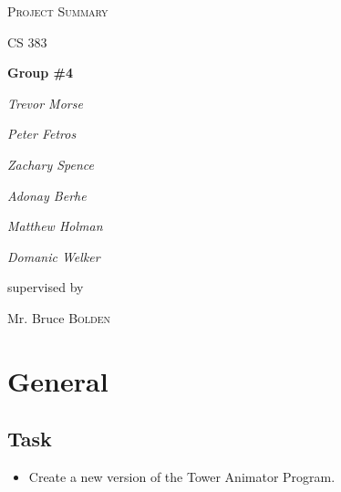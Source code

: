 \documentclass[12pt]{article}
\begin{document}
	\begin{titlepage}
		\centering
		{\scshape\LARGE Project Summary \par}
		\vspace{1cm}
		{\scshape\Large CS 383\par}
		\vspace{1.5cm}
		{\huge\bfseries Group \#4\par}
		\vspace{2cm}
		{\Large\itshape Trevor Morse\par}
		{\Large\itshape Peter Fetros\par}
		{\Large\itshape Zachary Spence\par}
		{\Large\itshape Adonay Berhe\par}
		{\Large\itshape Matthew Holman\par}
		{\Large\itshape Domanic Welker\par}
		\vfill
		supervised by\par
		Mr. Bruce \textsc{Bolden}
		
		\vfill
	\end{titlepage}
	
	\tableofcontents
	\clearpage
	
	\section{General}
	\subsection{Task}
	\begin{itemize}
		\item Create a new version of the Tower Animator Program.
	\end{itemize}
\end{document}
